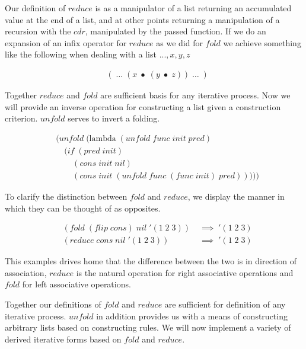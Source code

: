 Our definition of $reduce$ is as a manipulator of a list returning an accumulated 
value at the end of a list, and at other points returning a manipulation of a 
recursion with the $cdr$, manipulated by the passed function. If we do an 
expansion of an infix operator for $reduce$ as we did for $fold$ we achieve 
something like the following when dealing with a list $... , x, y, z$

\begin{figure}[ht]
\caption{}\label{scheme}
\begin{align*}
& ( \; \dots \; (x \; \bullet \; (y \; \bullet \; z)) \; \dots \; )
\end{align*}
\end{figure}

Together $reduce$ and $fold$ are sufficient basis for any iterative process. Now 
we will provide an inverse operation for constructing a list given a construction 
criterion. $unfold$ serves to invert a folding.

\begin{figure}[ht]
\caption{}\label{scheme}
\begin{align*}
& (unfold \; (\text{lambda} \; (unfold \; func \; init \; pred)
\\& \quad (if \; (pred \; init)
\\& \qquad (cons \; init \; nil)
\\& \qquad (cons \; init \; (unfold \; func \; (func \; init) \; pred)))))
\end{align*}
\end{figure}

To clarify the distinction between $fold$ and $reduce$, we display the manner in 
which they can be thought of as opposites.

\begin{figure}[ht]
\caption{}\label{scheme}
\begin{align*}
& (fold \; (flip \; cons) \; nil \; '(1 \; 2 \; 3)) \; &\implies \; '(1 \; 2 \; 3)
\\& (reduce \; cons \; nil \; '(1 \; 2 \; 3)) \; &\implies \; '(1 \; 2 \; 3)
\end{align*}
\end{figure}

This examples drives home that the difference between the two is in direction of 
association, $reduce$ is the natural operation for right associative operations 
and $fold$ for left associative operations.

Together our definitions of $fold$ and $reduce$ are sufficient for definition of 
any iterative process. $unfold$ in addition provides us with a means of 
constructing arbitrary lists based on constructing rules. We will now implement a 
variety of derived iterative forms based on $fold$ and $reduce$.

